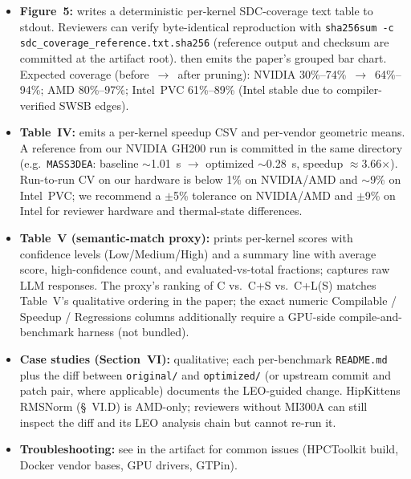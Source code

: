 \documentclass[conference]{IEEEtran}
\begin{document}
\begin{itemize}
\item \textbf{Figure~5:}  writes a deterministic per-kernel SDC-coverage text table to stdout. Reviewers can verify byte-identical reproduction with \texttt{sha256sum -c sdc\_coverage\_reference.txt.sha256} (reference output and checksum are committed at the artifact root).  then emits the paper's grouped bar chart. Expected coverage (before~$\to$~after pruning): NVIDIA 30\%--74\%~$\to$~64\%--94\%; AMD 80\%--97\%; Intel~PVC 61\%--89\% (Intel stable due to compiler-verified SWSB edges).
\item \textbf{Table~IV:}  emits a per-kernel speedup CSV and per-vendor geometric means. A reference  from our NVIDIA GH200 run is committed in the same directory (e.g.\ \texttt{MASS3DEA}: baseline $\sim$1.01~s $\to$ optimized $\sim$0.28~s, speedup $\approx$3.66$\times$). Run-to-run CV on our hardware is below 1\% on NVIDIA/AMD and $\sim$9\% on Intel~PVC; we recommend a $\pm$5\% tolerance on NVIDIA/AMD and $\pm$9\% on Intel for reviewer hardware and thermal-state differences.
\item \textbf{Table~V (semantic-match proxy):}  prints per-kernel scores with confidence levels (Low/Medium/High) and a summary line with average score, high-confidence count, and evaluated-vs-total fractions;  captures raw LLM responses. The proxy's ranking of C vs.\ C+S vs.\ C+L(S) matches Table~V's qualitative ordering in the paper; the exact numeric Compilable / Speedup / Regressions columns additionally require a GPU-side compile-and-benchmark harness (not bundled).
\item \textbf{Case studies (Section~VI):} qualitative; each per-benchmark \texttt{README.md} plus the diff between \texttt{original/} and \texttt{optimized/} (or upstream commit and patch pair, where applicable) documents the LEO-guided change. HipKittens RMSNorm (\S~VI.D) is AMD-only; reviewers without MI300A can still inspect the diff and its LEO analysis chain but cannot re-run it.
\item \textbf{Troubleshooting:} see  in the artifact for common issues (HPCToolkit build, Docker vendor bases, GPU drivers, GTPin).
\end{itemize}
\end{document}

